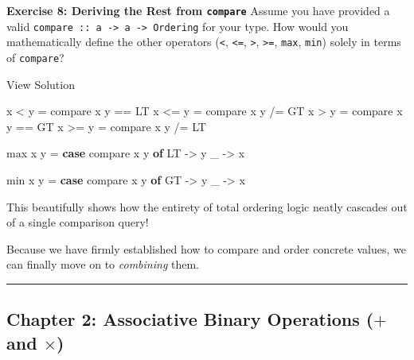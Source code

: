 \documentclass[
]{article}
\newenvironment{Shaded}{}{}
\newcommand{\DataTypeTok}[1]{\textcolor[rgb]{0.56,0.13,0.00}{#1}}
\newcommand{\FunctionTok}[1]{\textcolor[rgb]{0.02,0.16,0.49}{#1}}
\newcommand{\KeywordTok}[1]{\textcolor[rgb]{0.00,0.44,0.13}{\textbf{#1}}}
\newcommand{\NormalTok}[1]{#1}
\newcommand{\OperatorTok}[1]{\textcolor[rgb]{0.40,0.40,0.40}{#1}}
\newcommand{\OtherTok}[1]{\textcolor[rgb]{0.00,0.44,0.13}{#1}}
\begin{document}
\begin{itemize}
  \textbf{Exercise 8: Deriving the Rest from \texttt{compare}} Assume
  you have provided a valid
  \texttt{compare\ ::\ a\ -\textgreater{}\ a\ -\textgreater{}\ Ordering}
  for your type. How would you mathematically define the other operators
  (\texttt{\textless{}}, \texttt{\textless{}=}, \texttt{\textgreater{}},
  \texttt{\textgreater{}=}, \texttt{max}, \texttt{min}) solely in terms
  of \texttt{compare}?

  View Solution

\begin{Shaded}
\begin{Highlighting}[]
\NormalTok{x }\OperatorTok{\textless{}}\NormalTok{  y }\OtherTok{=} \FunctionTok{compare}\NormalTok{ x y }\OperatorTok{==} \DataTypeTok{LT}
\NormalTok{x }\OperatorTok{\textless{}=}\NormalTok{ y }\OtherTok{=} \FunctionTok{compare}\NormalTok{ x y }\OperatorTok{/=} \DataTypeTok{GT}
\NormalTok{x }\OperatorTok{\textgreater{}}\NormalTok{  y }\OtherTok{=} \FunctionTok{compare}\NormalTok{ x y }\OperatorTok{==} \DataTypeTok{GT}
\NormalTok{x }\OperatorTok{\textgreater{}=}\NormalTok{ y }\OtherTok{=} \FunctionTok{compare}\NormalTok{ x y }\OperatorTok{/=} \DataTypeTok{LT}

\FunctionTok{max}\NormalTok{ x y }\OtherTok{=} \KeywordTok{case} \FunctionTok{compare}\NormalTok{ x y }\KeywordTok{of}
              \DataTypeTok{LT} \OtherTok{{-}\textgreater{}}\NormalTok{ y}
\NormalTok{              \_  }\OtherTok{{-}\textgreater{}}\NormalTok{ x}

\FunctionTok{min}\NormalTok{ x y }\OtherTok{=} \KeywordTok{case} \FunctionTok{compare}\NormalTok{ x y }\KeywordTok{of}
              \DataTypeTok{GT} \OtherTok{{-}\textgreater{}}\NormalTok{ y}
\NormalTok{              \_  }\OtherTok{{-}\textgreater{}}\NormalTok{ x}
\end{Highlighting}
\end{Shaded}

  This beautifully shows how the entirety of total ordering logic neatly
  cascades out of a single comparison query!
\end{itemize}

Because we have firmly established how to compare and order concrete
values, we can finally move on to \emph{combining} them.

\begin{center}\rule{0.5\linewidth}{0.5pt}\end{center}

\subsection{\texorpdfstring{Chapter 2: Associative Binary Operations
(\(+\) and
\(\times\))}{Chapter 2: Associative Binary Operations (+ and \textbackslash times)}}\label{chapter-2-associative-binary-operations-and-times}
\end{document}
